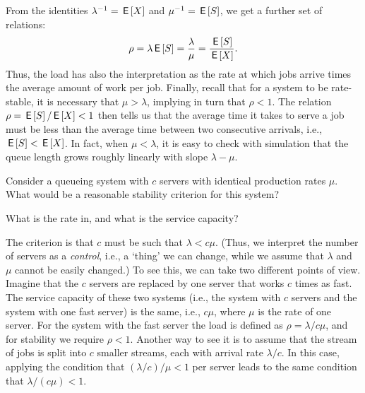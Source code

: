 From the identities $\lambda^{-1} = \,\mathsf{E}\left[X\right]$ and $\mu^{-1} = \,\mathsf{E}\left[S\right]$, we get
a further set of relations:
\begin{equation*}
  \rho = \lambda \,\mathsf{E}\left[S\right] = \frac{\lambda}{\mu} = \frac{\,\mathsf{E}\left[S\right]}{\,\mathsf{E}\left[X\right]}.
\end{equation*}
Thus, the load has also the interpretation as the rate at which jobs
arrive times the average amount of work per job.  Finally,
recall that for a system to be rate-stable, it is necessary that
$\mu> \lambda$, implying in turn that $\rho < 1$. The relation
$\rho=\,\mathsf{E}\left[S\right]/ \,\mathsf{E}\left[X\right] < 1$ then tells us that the average time it takes to
serve a job must be less than the average time between two consecutive
arrivals, i.e., $\,\mathsf{E}\left[S\right] < \,\mathsf{E}\left[X\right]$. In fact, when $\mu < \lambda$, it is easy to check with simulation that the queue length
grows roughly linearly with slope $\lambda - \mu$.


\begin{exercise}
  Consider a queueing system with $c$ servers with identical production rates $\mu$.
  What would be a reasonable stability criterion for this system?
\begin{hint}
What is the rate in, and what is the service capacity?
\end{hint}
\begin{solution}
    The criterion is that $c$ must be such that $\lambda < c\mu$.
    (Thus, we interpret the number of servers as a \emph{control}, i.e., a `thing' we can change, while we assume that $\lambda$ and $\mu$ cannot be easily changed.)
    To see this, we can take two different points of view.
    Imagine that the $c$ servers are replaced by one server that works $c$ times as fast.
    The service capacity of these two systems (i.e., the system with $c$ servers and the system with one fast server) is the same, i.e., $c\mu$, where $\mu$ is the rate of one server.
    For the system with the fast server the load is defined as $\rho =\lambda/c\mu$, and for stability we require $\rho<1$.
    Another way to see it is to assume that the stream of jobs is split into $c$ smaller streams, each with arrival rate $\lambda/c$.
    In this case, applying the condition that $(\lambda/c )/\mu<1$ per server leads to the same condition that $\lambda/(c\mu) < 1$.
\end{solution}
\end{exercise}





